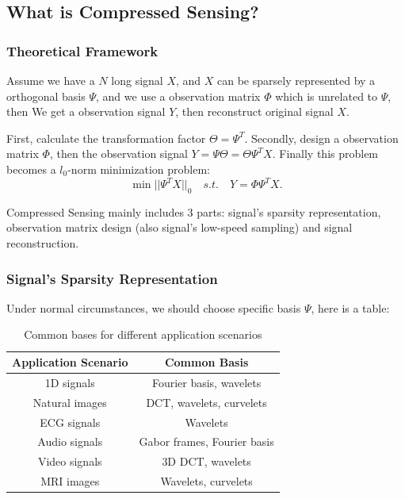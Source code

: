 \documentclass[12pt]{ctexart}
\begin{document}
\newpage
\subsection{\textbf{What is Compressed Sensing?}}

\subsubsection{\textbf{Theoretical Framework}}

Assume we have a $N$ long signal $X$, and $X$ can be sparsely represented by a orthogonal
basis $\Psi$, and we use a observation matrix $\Phi$ which is unrelated to $\Psi$, then We
get a observation signal $Y$, then reconstruct original signal $X$.

First, calculate the transformation factor $\Theta = \Psi^T$. Secondly, design a observation
matrix $\Phi$, then the observation signal $Y = \Psi \Theta = \Theta \Psi^T X$. Finally
this problem becomes a $l_0$-norm minimization problem:
\[
\min ||\Psi^T X||_0 \quad s.t. \quad Y = \Phi \Psi^T X.
\]

Compressed Sensing mainly includes 3 parts: signal's sparsity representation, observation
matrix design (also signal's low-speed sampling) and signal reconstruction.

\subsubsection{\textbf{Signal's Sparsity Representation}}

Under normal circumstances, we should choose specific basis $\Psi$, here is a table:

\begin{table}[H]
  \centering
  \begin{tabular}{|c|c|}
    \hline
    Application Scenario & Common Basis \\
    \hline
    1D signals      & Fourier basis, wavelets             \\
    Natural images  & DCT, wavelets, curvelets            \\
    ECG signals     & Wavelets                            \\
    Audio signals   & Gabor frames, Fourier basis         \\
    Video signals   & 3D DCT, wavelets                    \\
    MRI images      & Wavelets, curvelets                 \\
    \hline
  \end{tabular}
  \caption*{Common bases for different application scenarios}
\end{table}
\end{document}
